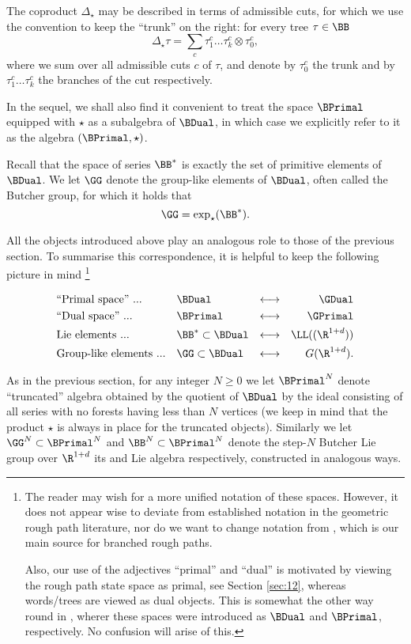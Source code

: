 \documentclass{article}
\begin{document}
The coproduct $\Delta_\star$ may be described in terms of admissible cuts, for which we use the convention to keep the ``trunk'' on the right: for every tree $\tau \in \BB$
\[
\Delta_\star \tau = \sum_c \tau^c_1\ldots \tau^c_k \otimes \tau^c_0,
\]
where we sum over all admissible cuts $c$ of $\tau$, and denote by $\tau^c_0$ the trunk and by $\tau^c_1\ldots \tau^c_k$ the branches of the cut respectively.


In the sequel, we shall also find it convenient to treat the space $\BPrimal$ equipped with $\star$ as a subalgebra of $\BDual$, in which case we explicitly refer to it as the algebra $(\BPrimal,\star)$.

Recall that the space of series $\BB^*$ is exactly the set of primitive elements of $\BDual$. We let $\GG$ denote the group-like elements of $\BDual$, often called the Butcher group, for which it holds that
\[
\GG = \exp_\star (\BB^*).
\]

All the objects introduced above play an analogous role to those of the previous section. To summarise this correspondence, it is helpful to keep the following picture in mind
\footnote{The reader may wish for a more unified notation of these spaces. However, it does not appear wise to deviate from established notation in the geometric rough path literature,
nor do we want to change notation from \cite{HairerKelly15}, which is our main source for branched rough paths.

Also, our use of the adjectives ``primal'' and ``dual'' is motivated by viewing the rough path state space as primal, see Section \ref{sec:12}, whereas words/trees are viewed as dual objects. This is somewhat the other way round in \cite{HairerKelly15}, wherer these spaces were introduced as $\BDual$ and $\BPrimal$, respectively. No confusion will arise of this.}

\begin{align*}
&\text{``Primal space'' ...} &&\BDual &\longleftrightarrow &&\GDual \\
&\text{``Dual space'' ...} && \BPrimal &\longleftrightarrow &&\GPrimal \\
&\text{Lie elements ...} &&\BB^* \subset \BDual  &\longleftrightarrow && \LL((\R^{1+d})) \\
&\text{Group-like elements ...} &&\GG \subset \BDual &\longleftrightarrow && G(\R^{1+d}).
\end{align*}


As in the previous section, for any integer $N \geq 0$ we let $\BPrimal^N$ denote ``truncated'' algebra obtained by the quotient of $\BDual$ by the ideal consisting of all series with no forests having less than $N$ vertices (we keep in mind that the product $\star$ is always in place for the truncated objects). Similarly we let $\GG^N \subset \BPrimal^N$ and $\BB^N \subset \BPrimal^N$ denote the step-$N$ Butcher Lie group over $\R^{1+d}$ its and Lie algebra respectively, constructed in analogous ways.
\end{document}
